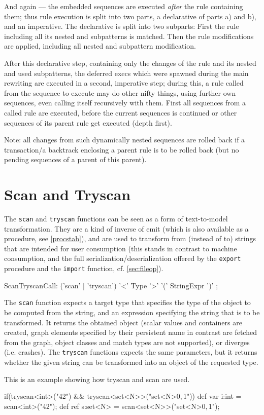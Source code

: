 \begin{warning}
And again --- the embedded sequences are executed \emph{after} the rule containing them;
thus rule execution is split into two parts, a declarative of parts a) and b), and an imperative.
The declarative is split into two subparts:
First the rule including all its nested and subpatterns is matched.
Then the rule modifications are applied, including all nested and subpattern modification.

After this declarative step, containing only the changes of the rule and its nested and used subpatterns,
the deferred execs which were spawned during the main rewriting are executed in a second, imperative step;
during this, a rule called from the sequence to execute may do other nifty things,
using further own sequences, even calling itself recursively with them.
First all sequences from a called rule are executed, before the current sequences is continued or other sequences of its parent rule get executed (depth first).

Note: all changes from such dynamically nested sequences are rolled back if a transaction/a backtrack enclosing a parent rule is to be rolled back (but no pending sequences of a parent of this parent).
\end{warning}


\section{Scan and Tryscan}\label{sec:scantryscan}
The \texttt{scan} and \texttt{tryscan} functions can be seen as a form of text-to-model transformation.
They are a kind of inverse of emit (which is also available as a procedure, see \ref{procstab}), and are used to transform from (instead of to) strings that are intended for user consumption (this stands in contrast to machine consumption, and the full serialization/deserialization offered by the \texttt{export} procedure and the \texttt{import} function, cf. \ref{sec:fileop}).

\begin{rail}
  ScanTryscanCall:
    ('scan' | 'tryscan') '<' Type '>' '(' StringExpr ')'
  ;
\end{rail}

The \texttt{scan} function expects a target type that specifies the type of the object to be computed from the string, and an expression specifying the string that is to be transformed.
It returns the obtained object (scalar values and containers are created, graph elements specified by their persistent name in contrast are fetched from the graph, object classes and match types are not supported), or diverges (i.e. crashes).
The \texttt{tryscan} functions expects the same parameters, but it returns whether the given string can be transformed into an object of the requested type.

\begin{example}
	This is an example showing how tryscan and scan are used.
	\begin{grgen}
  if(tryscan<int>("42") && tryscan<set<N>>("set<N>{$0,$1}")) {
    def var i:int = scan<int>("42");
    def ref s:set<N> = scan<set<N>>("set<N>{$0,$1}");
  }
	\end{grgen}
\end{example}
